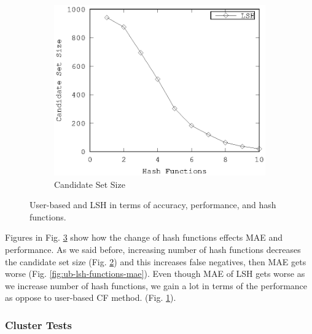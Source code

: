 \documentclass[conference]{IEEEtran}
\begin{document}
\begin{figure}[!h]
\begin{subfigure}[b]{0.225\textwidth}
                \label{fig:ub-lsh-functions-runtime}
        \end{subfigure} 
        \\
         \begin{subfigure}[b]{0.225\textwidth}
                \includegraphics[width=\textwidth]{charts/lsh-canidate-hash-functions.eps}
                \caption{Candidate Set Size}
                \label{fig:lsh-functions-candidate-size}
        \end{subfigure} 
        \caption{User-based and LSH in terms of accuracy, performance, and hash functions.}
        \label{fig:ub-lsh-functions}
\end{figure}

Figures in Fig. \ref{fig:ub-lsh-functions} show how the change of hash 
functions effects MAE and performance. As we said before, increasing number of 
hash functions decreases the candidate set size (Fig. \ref{fig:lsh-functions-candidate-size}) 
and this increases false negatives, then MAE gets worse (Fig. \ref{fig:ub-lsh-functions-mae}). 
Even though MAE of LSH gets worse as we increase number of hash functions, we 
gain a lot in terms of the performance as oppose to user-based CF method. (Fig. \ref{fig:ub-lsh-functions-runtime}). 

\subsubsection{Cluster Tests}
\label{subsubsec:cluster_tests}
\end{document}
